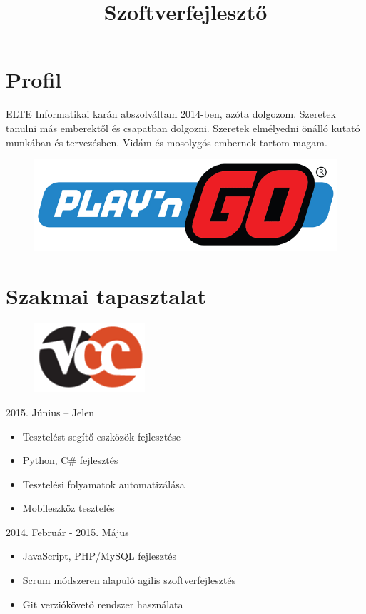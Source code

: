 \documentclass[12pt,a4paper,sans]{moderncv}   %
\title{Szoftverfejlesztő}                          %
\begin{document}
\makecvtitle
\section{Profil}
ELTE Informatikai karán abszolváltam 2014-ben, azóta dolgozom.
Szeretek tanulni más emberektől és csapatban dolgozni.
Szeretek elmélyedni önálló kutató munkában és tervezésben.
Vidám és mosolygós embernek tartom magam.\\

\begin{figure}
  \bigskip
  \bigskip
  \includegraphics[width=0.2\linewidth, right]{play-n-go-logo.png}
\end{figure}

\section{Szakmai tapasztalat}

\begin{figure}
  \bigskip
  \bigskip
  \bigskip
  \bigskip
  \includegraphics[width=0.1\linewidth, right]{vcc-logo.png}
\end{figure}

{
  2015. Június -- Jelen
  \begin{itemize}%
  \item Tesztelést segítő eszközök fejlesztése
  \item Python, C\# fejlesztés
  \item Tesztelési folyamatok automatizálása
  \item Mobileszköz tesztelés
  \end{itemize}
}


{
  2014. Február - 2015. Május
  \begin{itemize}%
  \item JavaScript, PHP/MySQL fejlesztés
  \item Scrum módszeren alapuló agilis szoftverfejlesztés
  \item Git verziókövető rendszer használata
  \end{itemize}
}
\end{document}
